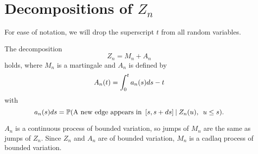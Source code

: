 

\section{Decompositions of $Z_n$}

For ease of notation, we will drop the superscript $t$ from all random variables.


\begin{lemma} \label{L: decomp Zn}
	The decomposition 
	\begin{equation} \label{E: decomp Zn}
	Z_n = M_n + A_n
	\end{equation}
	holds, where $M_n$ is a martingale and $A_n$ is defined by
	\begin{equation} \label{D: An}
	A_n(t) = \int_{0}^{t} a_n(s)ds - t
	\end{equation}
	with
	\begin{equation} \label{D: an}
	a_n(s)ds = \mathbb{P}(\text{A new edge appears in} \enspace [s, s+ds] \: | \: Z_n(u), \enspace u \leq s).
	\end{equation}	
\end{lemma}
\begin{note} \label{N: decomp Zn}
	$A_n$ is a continuous process of bounded variation, so jumps of $M_n$ are the same as jumps of $Z_n$. Since $Z_n$ and $A_n$ are of bounded variation, $M_n$ is a cadlaq process of bounded variation.
\end{note}


